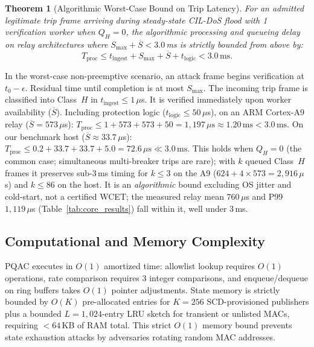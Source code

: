 \documentclass[journal]{IEEEtran}
\newtheorem{theorem}{Theorem}
\newenvironment{proof}{\begin{IEEEproof}}{\end{IEEEproof}}
\begin{document}
\begin{theorem}[Algorithmic Worst-Case Bound on Trip Latency]
\label{thm:deadline}
For an admitted legitimate trip frame arriving during steady-state CIL-DoS flood with 1 verification worker when $Q_H = 0$, the algorithmic processing and queueing delay on relay architectures where $S_{\max} + \overline{S} < 3.0$\,ms is strictly bounded from above by:
\begin{equation}
T_{\text{proc}} \le t_{\text{ingest}} + S_{\max} + \overline{S} + t_{\text{logic}} < 3.0\,\text{ms}.
\end{equation}
\end{theorem}
\begin{proof}
In the worst-case non-preemptive scenario, an attack frame begins verification at $t_0 - \epsilon$. Residual time until completion is at most $S_{\max}$. The incoming trip frame is classified into Class~$H$ in $t_{\text{ingest}} \le 1\,\mu$s. It is verified immediately upon worker availability ($\overline{S}$). Including protection logic ($t_{\text{logic}} \le 50\,\mu$s), on an ARM Cortex-A9 relay ($\overline{S} = 573\,\mu$s):
$T_{\text{proc}} \le 1 + 573 + 573 + 50 = 1{,}197\,\mu\text{s} \approx 1.20\,\text{ms} < 3.0\,\text{ms}$. On our benchmark host ($\overline{S} \approx 33.7\,\mu$s):
$T_{\text{proc}} \le 0.2 + 33.7 + 33.7 + 5.0 = 72.6\,\mu\text{s} \ll 3.0\,\text{ms}$.
This holds when $Q_H=0$ (the common case; simultaneous multi-breaker trips are rare); with $k$ queued Class~$H$ frames it preserves sub-3\,ms timing for $k\le 3$ on the A9 ($624+4\times 573=2{,}916\,\mu$s) and $k\le 86$ on the host. It is an \emph{algorithmic} bound excluding OS jitter and cold-start, not a certified WCET; the measured relay mean $760\,\mu$s and P99 $1{,}119\,\mu$s (Table~\ref{tab:core_results}) fall within it, well under 3\,ms.
\end{proof}

\subsection{Computational and Memory Complexity}
PQAC executes in $O(1)$ amortized time: allowlist lookup requires $O(1)$ operations, rate comparison requires 3 integer comparisons, and enqueue/dequeue on ring buffers takes $O(1)$ pointer adjustments. State memory is strictly bounded by $O(K)$ pre-allocated entries for $K=256$ SCD-provisioned publishers plus a bounded $L=1{,}024$-entry LRU sketch for transient or unlisted MACs, requiring $<64$\,KB of RAM total. This strict $O(1)$ memory bound prevents state exhaustion attacks by adversaries rotating random MAC addresses.
\end{document}
